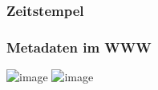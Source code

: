 \documentclass[12pt]{beamer}
\begin{document}
\begin{frame}
    \frametitle{Zeitstempel}
    \begin{center}


    \end{center}
\end{frame}

\begin{frame}
    \frametitle{Metadaten im WWW}
    \begin{center} 
        \includegraphics<1>[width=0.7\textwidth]{img/lightbeam_1.png}
        \includegraphics<2>[width=0.7\textwidth]{img/lightbeam_2.png}
    \end{center}
\end{frame}
\end{document}
